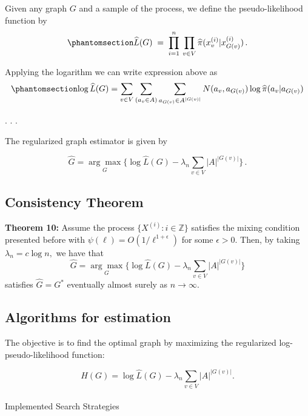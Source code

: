 \documentclass[
  english,
  letterpaper,
  DIV=11,
  numbers=noendperiod]{scrartcl}
\makeatletter
\let\oldparagraph\paragraph
\renewcommand{\paragraph}{
    \@ifstar
      \xxxParagraphStar
      \xxxParagraphNoStar
  }
\newcommand{\xxxParagraphStar}[1]{\oldparagraph*{#1}\mbox{}}
\newcommand{\xxxParagraphNoStar}[1]{\oldparagraph{#1}\mbox{}}
\makeatother
\begin{document}
Given any graph \(G\) and a sample of the process, we define the
pseudo-likelihood function by
\begin{equation}\phantomsection\label{eq-def-lhat}{
\widehat L(G) \;=\;  \prod_{i=1}^n \:\prod_{v \in V}  \widehat\pi(x^{(i)}_v | x^{(i)}_{G(v)})\,.
}\end{equation}

Applying the logarithm we can write expression above as
\begin{equation}\phantomsection\label{eq-log-pseudo}{
\log \widehat L(G) = \sum_{v \in V} \sum_{(a_v\in A)} \sum_{a_{G(v)}\in A^{|G(v)|}} N(a_v,a_{G(v)})\log \widehat\pi(a_v|a_{G(v)})
}\end{equation}

. . .

The regularized graph estimator is given by

\[
  \widehat G = \underset{G}{\arg\max}\Big\{\log \widehat L(G) - \lambda_n \sum_{v \in V} |A|^{|G(v)|}\Big\} \,.
\]

\subsection{Consistency Theorem}\label{consistency-theorem}

\textbf{Theorem 10:} Assume the process
\(\{X^{(i)}: i \in \mathbb{Z}\}\) satisfies the mixing condition
presented before with \(\psi(\ell) = O(1/\ell^{1+\epsilon})\) for some
\(\epsilon>0.\) Then, by taking \(\lambda_n = c \log n,\) we have that
\begin{equation*}
  \widehat G = \underset{G}{\arg\max}\Big\{\log \widehat L(G) - \lambda_n \sum_{v \in V} |A|^{|G(v)|}\Big\}
\end{equation*} satisfies \(\widehat G=G^*\) eventually almost surely as
\(n\to \infty.\)

\subsection{Algorithms for estimation}\label{algorithms-for-estimation}

The objective is to find the optimal graph by maximizing the regularized
log-pseudo-likelihood function:

\[H(G) = \log \widehat L(G) - \lambda_n \sum_{v \in V} |A|^{|G(v)|}.\]

\paragraph{Implemented Search
Strategies}\label{implemented-search-strategies}
\end{document}

